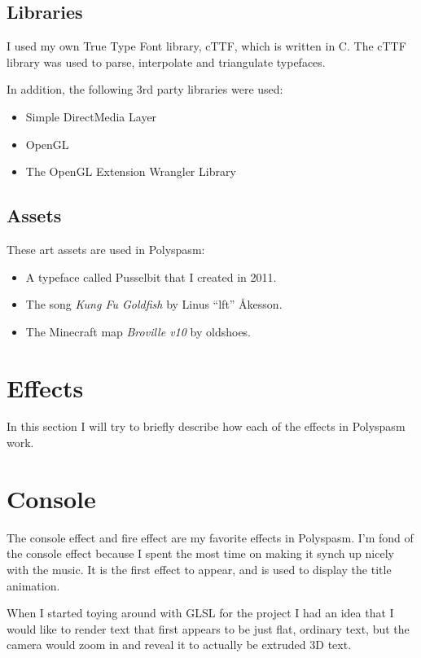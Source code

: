 \documentclass{acmsiggraph}               %
\begin{document}
\subsection{Libraries}

I used my own True Type Font library, cTTF, which is written in C. The cTTF
library was used to parse, interpolate and triangulate typefaces.

In addition, the following 3rd party libraries were used:

\begin{itemize}
	\item Simple DirectMedia Layer
	\item OpenGL
	\item The OpenGL Extension Wrangler Library
\end{itemize}

\subsection{Assets}

These art assets are used in Polyspasm:

\begin{itemize}
	\item A typeface called Pusselbit that I created in 2011.
	\item The song \emph{Kung Fu Goldfish} by Linus ``lft'' Åkesson.
	\item The Minecraft map \emph{Broville v10} by oldshoes.
\end{itemize}

\section{Effects}

In this section I will try to briefly describe how each of the effects in
Polyspasm work.

\section{Console}

The console effect and fire effect are my favorite effects in Polyspasm.  I'm
fond of the console effect because I spent the most time on making it synch up
nicely with the music. It is the first effect to appear, and is used to display
the title animation.

When I started toying around with GLSL for the project I had an idea that I
would like to render text that first appears to be just flat, ordinary text,
but the camera would zoom in and reveal it to actually be extruded 3D text.
\end{document}
